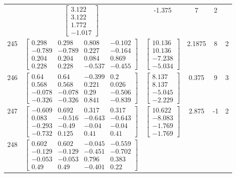 \documentclass[a4paper,12pt]{article}
\begin{document}
\begin{tabular}{c c c c c c}
&
$\begin{bmatrix} 3.122 \\ 3.122 \\ 1.772 \\ -1.017 \end{bmatrix}$
&
-1.375
&
7
&
2
\\
245
&
$\begin{bmatrix} 0.298 & 0.298 & 0.808 & -0.102 \\ -0.789 & -0.789 & 0.227 & -0.164 \\ 0.204 & 0.204 & 0.084 & 0.869 \\ 0.228 & 0.228 & -0.537 & -0.455 \end{bmatrix}$
&
$\begin{bmatrix} 10.136 \\ 10.136 \\ -7.238 \\ -5.034 \end{bmatrix}$
&
2.1875
&
8
&
2
\\
246
&
$\begin{bmatrix} 0.64 & 0.64 & -0.399 & 0.2 \\ 0.568 & 0.568 & 0.221 & 0.026 \\ -0.078 & -0.078 & 0.29 & -0.506 \\ -0.326 & -0.326 & 0.841 & -0.839 \end{bmatrix}$
&
$\begin{bmatrix} 8.137 \\ 8.137 \\ -5.045 \\ -2.229 \end{bmatrix}$
&
0.375
&
9
&
3
\\
247
&
$\begin{bmatrix} -0.609 & 0.692 & 0.317 & 0.317 \\ 0.083 & -0.516 & -0.643 & -0.643 \\ -0.293 & -0.49 & -0.04 & -0.04 \\ -0.732 & 0.125 & 0.41 & 0.41 \end{bmatrix}$
&
$\begin{bmatrix} 10.622 \\ -8.083 \\ -1.769 \\ -1.769 \end{bmatrix}$
&
2.875
&
-1
&
2
\\
248
&
$\begin{bmatrix} 0.602 & 0.602 & -0.045 & -0.559 \\ -0.129 & -0.129 & -0.451 & -0.702 \\ -0.053 & -0.053 & 0.796 & 0.383 \\ 0.49 & 0.49 & -0.401 & 0.22 \end{bmatrix}$

\end{tabular}
\end{document}
